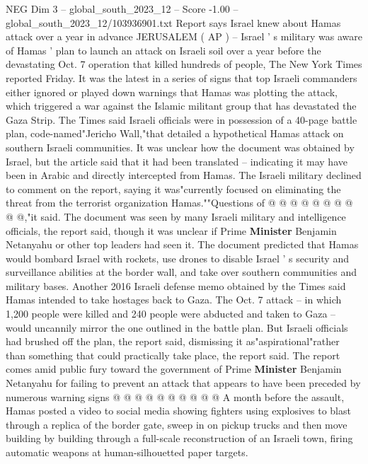 \begin{textsample}{NEG Dim 3 – global\_south\_2023\_12 – Score -1.00 – global\_south\_2023\_12/103936901.txt}  \label{ex:f3_neg_032}
Report says Israel knew about Hamas attack over a year in advance JERUSALEM ( AP ) -- Israel ' s military was aware of Hamas ' plan to launch an attack on Israeli soil over a year before the devastating Oct. 7 operation that killed hundreds of people, The New York Times reported Friday.
It was the latest in a series of signs that top Israeli commanders either ignored or played down warnings that Hamas was plotting the attack, which triggered a war against the Islamic militant group that has devastated the Gaza Strip.
The Times said Israeli officials were in possession of a 40-page battle plan, code-named"Jericho Wall,"that detailed a hypothetical Hamas attack on southern Israeli communities.
It was unclear how the document was obtained by Israel, but the article said that it had been translated -- indicating it may have been in Arabic and directly intercepted from Hamas.
The Israeli military declined to comment on the report, saying it was"currently focused on eliminating the threat from the terrorist organization Hamas.""Questions of @ @ @ @ @ @ @ @ @ @,"it said.
The document was seen by many Israeli military and intelligence officials, the report said, though it was unclear if Prime \textbf{Minister} Benjamin Netanyahu or other top leaders had seen it.
The document predicted that Hamas would bombard Israel with rockets, use drones to disable Israel ' s security and surveillance abilities at the border wall, and take over southern communities and military bases.
Another 2016 Israeli defense memo obtained by the Times said Hamas intended to take hostages back to Gaza.
The Oct. 7 attack -- in which 1,200 people were killed and 240 people were abducted and taken to Gaza -- would uncannily mirror the one outlined in the battle plan.
But Israeli officials had brushed off the plan, the report said, dismissing it as"aspirational"rather than something that could practically take place, the report said.
The report comes amid public fury toward the government of Prime \textbf{Minister} Benjamin Netanyahu for failing to prevent an attack that appears to have been preceded by numerous warning signs @ @ @ @ @ @ @ @ @ @ A month before the assault, Hamas posted a video to social media showing fighters using explosives to blast through a replica of the border gate, sweep in on pickup trucks and then move building by building through a full-scale reconstruction of an Israeli town, firing automatic weapons at human-silhouetted paper targets.

\end{textsample}
